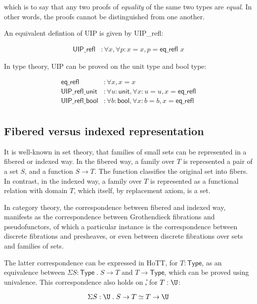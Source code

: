 \documentclass[10pt]{art.cls/art}
\newcommand{\Type}{\textsf{Type}}
\begin{document}
which is to say that any two proofs of \emph{equality} of the same two types are \emph{equal}. In other words, the proofs cannot be distinguished from one another.

An equivalent defintion of UIP is given by \textsf{UIP\_refl}:

\begin{align*}
  \textsf{UIP\_refl} & : \forall x, \forall p : x = x, p = \textsf{eq\_refl } x
\end{align*}

In type theory, UIP can be proved on the unit type and bool type:

\begin{align*}
  \textsf{eq\_refl}        & : \forall x, x = x                                                    \\
  \textsf{UIP\_refl\_unit} & : \forall u : \textsf{unit}, \forall x : u = u, x = \textsf{eq\_refl} \\
  \textsf{UIP\_refl\_bool} & : \forall b : \textsf{bool}, \forall x : b = b, x = \textsf{eq\_refl} \\
\end{align*}


\subsection{Fibered versus indexed representation}
It is well-known in set theory, that families of small sets can be represented in a fibered or indexed way. In the fibered way, a family over $T$ is represented a pair of a set $S$, and a function $S \rightarrow T$. The function classifies the original set into fibers. In contrast, in the indexed way, a family over $T$ is represented as a functional relation with domain $T$, which itself, by replacement axiom, is a set.

In category theory, the correspondence between fibered and indexed way, manifests as the correspondence between Grothendieck fibrations and pseudofunctors, of which a particular instance is the correspondence between discrete fibrations and presheaves, or even between discrete fibrations over sets and families of sets.

The latter correspondence can be expressed in HoTT, for $T: \Type$, as an equivalence between $\Sigma S: \Type\;.\;S \rightarrow T$ and $T \rightarrow \Type$, which can be proved using univalence. This correspondence also holds on \U, for $T: \U$:

\begin{equation*}
  \Sigma S: \U\;.\;S\rightarrow T \simeq T \rightarrow \U
\end{equation*}
\end{document}
